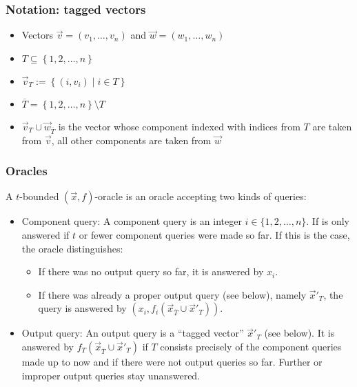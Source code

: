 \documentclass{beamer}
\begin{document}
\begin{frame}
  \frametitle{Notation: tagged vectors}
  \begin{itemize}
  \item Vectors $\overrightarrow{v}=(v_1,\dots,v_n)$ and $\overrightarrow{w}=(w_1,\dots,w_n)$
  \item $T\subseteq \left\{ 1,2,\dots,n \right\}$
  \item $\overrightarrow{v}_T := \left\{ (i,v_i) \mid i\in T \right\}$
  \item $\overline{T}=\left\{ 1,2,\dots,n \right\}\setminus T$
  \item $\overrightarrow{v}_T\cup \overrightarrow w_{\overline{T}}$ is the vector whose component indexed with indices from $T$ are taken from $\overrightarrow{v}$, all other components are taken from $\overrightarrow{w}$
  \end{itemize}
\end{frame}

\begin{frame}
  \frametitle{Oracles}
  \begin{definition}
    A $t$-bounded $(\overrightarrow{x},f)$-oracle is an oracle accepting two kinds of queries:
    \begin{itemize}
    \item Component query: A component query is an integer $i\in \{1,2,\dots,n\}$. If is only answered if $t$ or fewer component queries were made so far. If this is the case, the oracle distinguishes:
      \begin{itemize}
      \item If there was no output query so far, it is answered by $x_i$.
      \item If there was already a proper output query (see below), namely $\overrightarrow{x}'_T$, the query is answered by $(x_i,f_i(\overrightarrow{x}_{\overline{T}}\cup\overrightarrow{x}'_{T}))$.
      \end{itemize}
    \item Output query: An output query is a ``tagged vector'' $\overrightarrow{x}'_T$ (see below). It is answered by $f_T(\overrightarrow{x}_{\overline{T}}\cup\overrightarrow{x}'_{T})$ if $T$ consists precisely of the component queries made up to now and if there were not output queries so far. Further or improper output queries stay unanswered.
    \end{itemize}
  \end{definition}
\end{frame}
\end{document}

